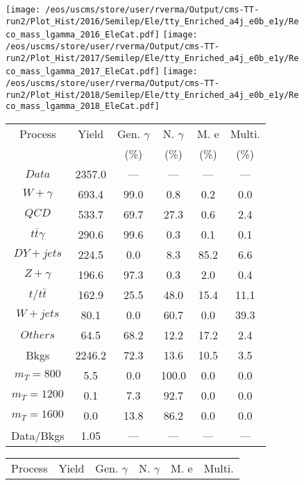 \begin{figure}
\centering
\texttt{[image: /eos/uscms/store/user/rverma/Output/cms-TT-run2/Plot\_Hist/2016/Semilep/Ele/tty\_Enriched\_a4j\_e0b\_e1y/Reco\_mass\_lgamma\_2016\_EleCat.pdf]}
\texttt{[image: /eos/uscms/store/user/rverma/Output/cms-TT-run2/Plot\_Hist/2017/Semilep/Ele/tty\_Enriched\_a4j\_e0b\_e1y/Reco\_mass\_lgamma\_2017\_EleCat.pdf]}
\texttt{[image: /eos/uscms/store/user/rverma/Output/cms-TT-run2/Plot\_Hist/2018/Semilep/Ele/tty\_Enriched\_a4j\_e0b\_e1y/Reco\_mass\_lgamma\_2018\_EleCat.pdf]}
\begin{minipage}[c]{0.32\textwidth}
\centering
\tiny{
\begin{tabular}{cccccc}
\hline
Process & Yield & Gen. $\gamma$ & N. $\gamma$ & M. e & Multi. \\
 &  & (\%) & (\%) & (\%) & (\%)  \\
\hline
                                                                      $ Data $ &  2357.0 &  --- &  --- &  --- &  ---\\
$ W+\gamma $ &  693.4 &  99.0 &  0.8 &  0.2 &  0.0\\
$ QCD $ &  533.7 &  69.7 &  27.3 &  0.6 &  2.4\\
$ t\bar{t}\gamma $ &  290.6 &  99.6 &  0.3 &  0.1 &  0.1\\
$ DY+jets $ &  224.5 &  0.0 &  8.3 &  85.2 &  6.6\\
$ Z+\gamma $ &  196.6 &  97.3 &  0.3 &  2.0 &  0.4\\
$ t/t\bar{t} $ &  162.9 &  25.5 &  48.0 &  15.4 &  11.1\\
$ W+jets $ &  80.1 &  0.0 &  60.7 &  0.0 &  39.3\\
$ Others $ &  64.5 &  68.2 &  12.2 &  17.2 &  2.4\\
Bkgs &  2246.2 &  72.3 &  13.6 &  10.5 &  3.5\\
$ m_{T} = 800 $ &  5.5 &  0.0 &  100.0 &  0.0 &  0.0\\
$ m_{T} = 1200 $ &  0.1 &  7.3 &  92.7 &  0.0 &  0.0\\
$ m_{T} = 1600 $ &  0.0 &  13.8 &  86.2 &  0.0 &  0.0\\
Data/Bkgs &  1.05 &  --- &  --- &  --- &  ---\\
\hline
\end{tabular}
}
\end{minipage}
\begin{minipage}[c]{0.32\textwidth}
\centering
\tiny{
\begin{tabular}{cccccc}
\hline
Process & Yield & Gen. $\gamma$ & N. $\gamma$ & M. e & Multi. \\

\end{tabular}}
\end{minipage}
\end{figure}
